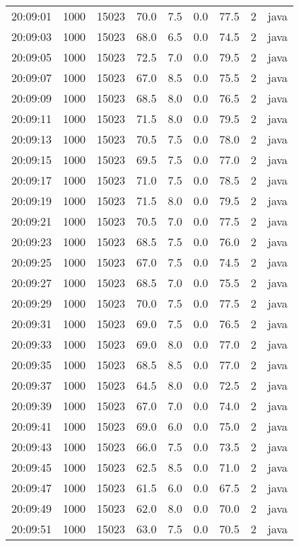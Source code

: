 \documentclass[11pt]{article}
\begin{document}
\begin{table}[htbp]
\begin{tabular}{rrrrrrrrl}
20:09:01 & 1000 & 15023 & 70.0 & 7.5 & 0.0 & 77.5 & 2 & java\\
20:09:03 & 1000 & 15023 & 68.0 & 6.5 & 0.0 & 74.5 & 2 & java\\
20:09:05 & 1000 & 15023 & 72.5 & 7.0 & 0.0 & 79.5 & 2 & java\\
20:09:07 & 1000 & 15023 & 67.0 & 8.5 & 0.0 & 75.5 & 2 & java\\
20:09:09 & 1000 & 15023 & 68.5 & 8.0 & 0.0 & 76.5 & 2 & java\\
20:09:11 & 1000 & 15023 & 71.5 & 8.0 & 0.0 & 79.5 & 2 & java\\
20:09:13 & 1000 & 15023 & 70.5 & 7.5 & 0.0 & 78.0 & 2 & java\\
20:09:15 & 1000 & 15023 & 69.5 & 7.5 & 0.0 & 77.0 & 2 & java\\
20:09:17 & 1000 & 15023 & 71.0 & 7.5 & 0.0 & 78.5 & 2 & java\\
20:09:19 & 1000 & 15023 & 71.5 & 8.0 & 0.0 & 79.5 & 2 & java\\
20:09:21 & 1000 & 15023 & 70.5 & 7.0 & 0.0 & 77.5 & 2 & java\\
20:09:23 & 1000 & 15023 & 68.5 & 7.5 & 0.0 & 76.0 & 2 & java\\
20:09:25 & 1000 & 15023 & 67.0 & 7.5 & 0.0 & 74.5 & 2 & java\\
20:09:27 & 1000 & 15023 & 68.5 & 7.0 & 0.0 & 75.5 & 2 & java\\
20:09:29 & 1000 & 15023 & 70.0 & 7.5 & 0.0 & 77.5 & 2 & java\\
20:09:31 & 1000 & 15023 & 69.0 & 7.5 & 0.0 & 76.5 & 2 & java\\
20:09:33 & 1000 & 15023 & 69.0 & 8.0 & 0.0 & 77.0 & 2 & java\\
20:09:35 & 1000 & 15023 & 68.5 & 8.5 & 0.0 & 77.0 & 2 & java\\
20:09:37 & 1000 & 15023 & 64.5 & 8.0 & 0.0 & 72.5 & 2 & java\\
20:09:39 & 1000 & 15023 & 67.0 & 7.0 & 0.0 & 74.0 & 2 & java\\
20:09:41 & 1000 & 15023 & 69.0 & 6.0 & 0.0 & 75.0 & 2 & java\\
20:09:43 & 1000 & 15023 & 66.0 & 7.5 & 0.0 & 73.5 & 2 & java\\
20:09:45 & 1000 & 15023 & 62.5 & 8.5 & 0.0 & 71.0 & 2 & java\\
20:09:47 & 1000 & 15023 & 61.5 & 6.0 & 0.0 & 67.5 & 2 & java\\
20:09:49 & 1000 & 15023 & 62.0 & 8.0 & 0.0 & 70.0 & 2 & java\\
20:09:51 & 1000 & 15023 & 63.0 & 7.5 & 0.0 & 70.5 & 2 & java\\

\end{tabular}
\end{table}
\end{document}
